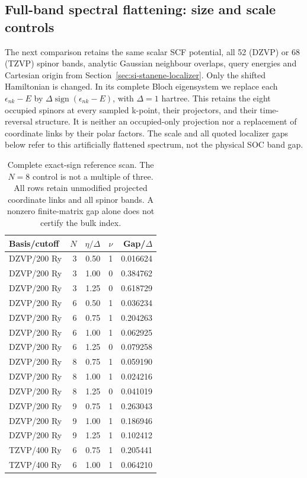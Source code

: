 \documentclass[11pt]{article}
\begin{document}
\subsection{Full-band spectral flattening: size and scale controls}
\label{sec:si-stanene-flattening}
The next comparison retains the same scalar SCF potential, all
52 (DZVP) or 68 (TZVP) spinor bands, analytic Gaussian neighbour
overlaps, query energies and Cartesian origin from
Section~\ref{sec:si-stanene-localizer}. Only the shifted Hamiltonian
is changed. In its complete Bloch eigensystem we replace each
$\epsilon_{nk}-E$ by
$\Delta\operatorname{sign}(\epsilon_{nk}-E)$, with
$\Delta=1$ hartree. This retains the eight occupied spinors at
every sampled k-point, their projectors, and their time-reversal
structure. It is neither an occupied-only projection nor a
replacement of coordinate links by their polar factors.
The scale and all quoted localizer gaps below refer to this
artificially flattened spectrum, not the physical SOC band gap.

\begin{table}[htbp]
\centering\small
\begin{tabular}{lrrrr}
\toprule
Basis/cutoff & $N$ & $\eta/\Delta$ & $\nu$ & Gap/$\Delta$\\
\midrule
DZVP/200 Ry & 3 & 0.50 & 1 & 0.016624\\
DZVP/200 Ry & 3 & 1.00 & 0 & 0.384762\\
DZVP/200 Ry & 3 & 1.25 & 0 & 0.618729\\
DZVP/200 Ry & 6 & 0.50 & 1 & 0.036234\\
DZVP/200 Ry & 6 & 0.75 & 1 & 0.204263\\
DZVP/200 Ry & 6 & 1.00 & 1 & 0.062925\\
DZVP/200 Ry & 6 & 1.25 & 0 & 0.079258\\
DZVP/200 Ry & 8 & 0.75 & 1 & 0.059190\\
DZVP/200 Ry & 8 & 1.00 & 1 & 0.024216\\
DZVP/200 Ry & 8 & 1.25 & 0 & 0.041019\\
DZVP/200 Ry & 9 & 0.75 & 1 & 0.263043\\
DZVP/200 Ry & 9 & 1.00 & 1 & 0.186946\\
DZVP/200 Ry & 9 & 1.25 & 1 & 0.102412\\
TZVP/400 Ry & 6 & 0.75 & 1 & 0.205441\\
TZVP/400 Ry & 6 & 1.00 & 1 & 0.064210\\
\bottomrule
\end{tabular}
\caption{Complete exact-sign reference scan. The $N=8$ control is
not a multiple of three. All rows retain unmodified projected
coordinate links and all spinor bands. A nonzero finite-matrix gap
alone does not certify the bulk index.}
\label{tab:si-stanene-flattening}
\end{table}
\end{document}
